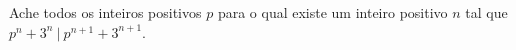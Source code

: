 Ache todos os inteiros positivos $p$ para o qual existe um inteiro positivo $n$ tal que $p^n+3^n~|~p^{n+1}+3^{n+1}$.
